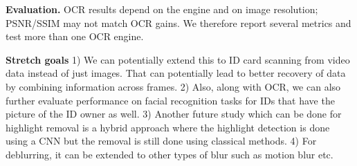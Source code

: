 \documentclass{article}
\begin{document}
\textbf{Evaluation.} OCR results depend on the engine and on image resolution; PSNR/SSIM may not match OCR gains. We therefore report several metrics and test more than one OCR engine.

\textbf{Stretch goals} 1) We can potentially extend this to ID card scanning from video data instead of just images. That can potentially lead to better recovery of data by combining information across frames. 2) Also, along with OCR, we can also further evaluate performance on facial recognition tasks for IDs that have the picture of the ID owner as well. 3) Another future study which can be done for highlight removal is a hybrid approach where the highlight detection is done using a CNN but the removal is still done using classical methods. 4) For deblurring, it can be extended to other types of blur such as motion blur etc.




\end{document}
